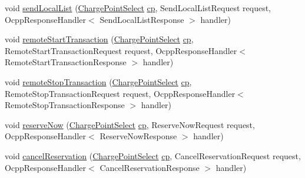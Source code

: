 \begin{DoxyCompactItemize}
void \hyperlink{classde_1_1rwth_1_1idsg_1_1steve_1_1ocpp_1_1soap_1_1_charge_point_service15___soap_invoker_af9ff2655ec703253c6f3cfe632c51d95}{send\+Local\+List} (\hyperlink{classde_1_1rwth_1_1idsg_1_1steve_1_1repository_1_1dto_1_1_charge_point_select}{Charge\+Point\+Select} \hyperlink{get_transaction_ids_8js_a02fb69feb56940fd46d72ea6a60e511f}{cp}, Send\+Local\+List\+Request request, Ocpp\+Response\+Handler$<$ Send\+Local\+List\+Response $>$ handler)
\item 
void \hyperlink{classde_1_1rwth_1_1idsg_1_1steve_1_1ocpp_1_1soap_1_1_charge_point_service15___soap_invoker_a4f30d3d25a5c89d5a9303c055f1449f7}{remote\+Start\+Transaction} (\hyperlink{classde_1_1rwth_1_1idsg_1_1steve_1_1repository_1_1dto_1_1_charge_point_select}{Charge\+Point\+Select} \hyperlink{get_transaction_ids_8js_a02fb69feb56940fd46d72ea6a60e511f}{cp}, Remote\+Start\+Transaction\+Request request, Ocpp\+Response\+Handler$<$ Remote\+Start\+Transaction\+Response $>$ handler)
\item 
void \hyperlink{classde_1_1rwth_1_1idsg_1_1steve_1_1ocpp_1_1soap_1_1_charge_point_service15___soap_invoker_a8d6b588fb8f2c3bf21daebb80913c15c}{remote\+Stop\+Transaction} (\hyperlink{classde_1_1rwth_1_1idsg_1_1steve_1_1repository_1_1dto_1_1_charge_point_select}{Charge\+Point\+Select} \hyperlink{get_transaction_ids_8js_a02fb69feb56940fd46d72ea6a60e511f}{cp}, Remote\+Stop\+Transaction\+Request request, Ocpp\+Response\+Handler$<$ Remote\+Stop\+Transaction\+Response $>$ handler)
\item 
void \hyperlink{classde_1_1rwth_1_1idsg_1_1steve_1_1ocpp_1_1soap_1_1_charge_point_service15___soap_invoker_a83963dacc9043e8c184b72efd59c87f5}{reserve\+Now} (\hyperlink{classde_1_1rwth_1_1idsg_1_1steve_1_1repository_1_1dto_1_1_charge_point_select}{Charge\+Point\+Select} \hyperlink{get_transaction_ids_8js_a02fb69feb56940fd46d72ea6a60e511f}{cp}, Reserve\+Now\+Request request, Ocpp\+Response\+Handler$<$ Reserve\+Now\+Response $>$ handler)
\item 
void \hyperlink{classde_1_1rwth_1_1idsg_1_1steve_1_1ocpp_1_1soap_1_1_charge_point_service15___soap_invoker_abea544028d13891f5f5d369ad04bb87d}{cancel\+Reservation} (\hyperlink{classde_1_1rwth_1_1idsg_1_1steve_1_1repository_1_1dto_1_1_charge_point_select}{Charge\+Point\+Select} \hyperlink{get_transaction_ids_8js_a02fb69feb56940fd46d72ea6a60e511f}{cp}, Cancel\+Reservation\+Request request, Ocpp\+Response\+Handler$<$ Cancel\+Reservation\+Response $>$ handler)
\end{DoxyCompactItemize}


